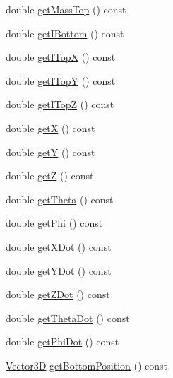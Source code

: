 \begin{DoxyCompactItemize}
\item 
double \hyperlink{class_lagrange_1_1_lagrangian_racer_a09dd99ca786308a18fb1d245ecbbbfd0}{get\-Mass\-Top} () const 
\item 
double \hyperlink{class_lagrange_1_1_lagrangian_racer_a04ad64e40b927f28d96d7bb458c68e4b}{get\-I\-Bottom} () const 
\item 
double \hyperlink{class_lagrange_1_1_lagrangian_racer_a30894c02d07bc862496cc9554b1a16e2}{get\-I\-Top\-X} () const 
\item 
double \hyperlink{class_lagrange_1_1_lagrangian_racer_aa8d89ff48c8a7bf3def041f9dd539901}{get\-I\-Top\-Y} () const 
\item 
double \hyperlink{class_lagrange_1_1_lagrangian_racer_abd471e7837c867c0f6f16b47a4cd3d14}{get\-I\-Top\-Z} () const 
\item 
double \hyperlink{class_lagrange_1_1_lagrangian_racer_a79220d9bc1c5b6f32d5cafe69dcf050b}{get\-X} () const 
\item 
double \hyperlink{class_lagrange_1_1_lagrangian_racer_a563536fe789d0283b9fc82f3a5b6a9ff}{get\-Y} () const 
\item 
double \hyperlink{class_lagrange_1_1_lagrangian_racer_a8cf4e66e33ac4cffdca6e7f0f1b14e61}{get\-Z} () const 
\item 
double \hyperlink{class_lagrange_1_1_lagrangian_racer_a4ad3d8b75a18350919469dc7165ea4dd}{get\-Theta} () const 
\item 
double \hyperlink{class_lagrange_1_1_lagrangian_racer_ae4a0f8ebfcc28911cde0233567d19cc1}{get\-Phi} () const 
\item 
double \hyperlink{class_lagrange_1_1_lagrangian_racer_a1bbbf1c37947a5414f047555bf375ec1}{get\-X\-Dot} () const 
\item 
double \hyperlink{class_lagrange_1_1_lagrangian_racer_a0f9b25e09ddef578e644a920d7064d9f}{get\-Y\-Dot} () const 
\item 
double \hyperlink{class_lagrange_1_1_lagrangian_racer_a490a9e8912b1299c92b6e2daec17c9b0}{get\-Z\-Dot} () const 
\item 
double \hyperlink{class_lagrange_1_1_lagrangian_racer_ae84b2dde39fbe737bdb9d3401e9d23f9}{get\-Theta\-Dot} () const 
\item 
double \hyperlink{class_lagrange_1_1_lagrangian_racer_a58963b1269a427232451a17ec9485c1c}{get\-Phi\-Dot} () const 
\item 
\hyperlink{class_vector3_d}{Vector3\-D} \hyperlink{class_lagrange_1_1_lagrangian_racer_aafd2da89d986b558ce77bc3f572c34dc}{get\-Bottom\-Position} () const 
\item 

\end{DoxyCompactItemize}
